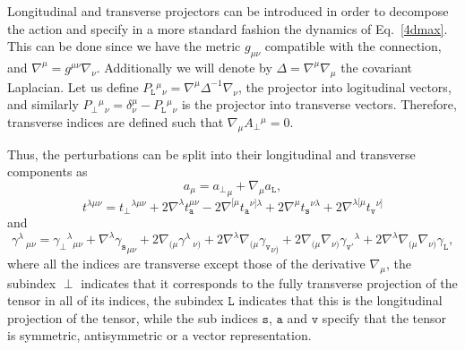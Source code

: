 \documentclass[aps,prd,12pt,twocolumn,superscriptaddress,showpacs,showkeys,reprint%
]{revtex4-1}
\newcommand\nab[1]{\nabla_{{#1}}}
\renewcommand{\(}{\left(}
\renewcommand{\)}{\right)}
\renewcommand{\[}{\left[}
\renewcommand{\]}{\right]}
\newcommand{\dn}[2]{{\mathrm{d}}^{#1}{#2}\;}
\newcommand{\hl}[1]{{\color{red} \bfseries{#1}}}
\begin{document}
Longitudinal and transverse projectors can be introduced in order to decompose the action and specify in a more standard fashion the dynamics of Eq.~\eqref{4dmax}. This can be done since we have the metric $g_{\mu\nu}$ compatible with the connection, and $\nabla^\mu=g^{\mu\nu}\nabla_\nu$. Additionally we will denote by $\Delta = \nabla^\mu\nabla_\mu$ the covariant Laplacian. Let us define $P_{\mathtt{L}}{}^\mu{}_\nu=\nabla^\mu\Delta^{-1} \nabla_\nu $, the projector into logitudinal vectors, and similarly $P_\perp{}^\mu{}_\nu=\delta^\mu_\nu -P_{\mathtt{L}}{}^\mu{}_\nu$ is the projector into transverse vectors. Therefore, transverse indices are defined such that $\nabla_\mu A_\perp{}^{\mu}=0$.

Thus, the perturbations can be split into their longitudinal and transverse components as
\begin{dmath}
  a_\mu = {a_\perp}_{\mu} + {\nabla}_{\mu}{a_{\mathtt{L}}},
\end{dmath}
\begin{dmath}
  {t}^{\lambda \mu \nu} =
  {t_\perp}^{\lambda \mu \nu}
  + 2  {\nabla}^{\lambda} {t_{\mathtt{a}}^{\mu \nu}}
  - 2  {\nabla}^{[\mu}{{t_{\mathtt{a}}}^{\nu] \lambda}} 
  + 2  {\nabla}^{\mu}{{t_{\mathtt{s}}}^{\nu \lambda}}
  + 2  {\nabla}^{\lambda [\mu}{{t_{\mathtt{v}}}^{\nu]}}
\end{dmath}
and
\begin{dmath}
  {\gamma}^{\lambda}\,_{\mu \nu}  =
  {\gamma_\perp}^{\lambda}{}_{\mu \nu}
  + {\nabla}^{\lambda}{{\gamma_{\mathtt{s}}}_{\mu \nu}}
  + 2  {\nabla}_{(\mu}{{\gamma}^{\lambda}\,_{\nu)}}
  + 2  {\nabla}^{\lambda}\nabla_{(\mu}{{\gamma_{\mathtt{v}}}_{\nu)}}
  + 2  \nab{(\mu} \nab{\nu)} {{\gamma_{\mathtt{v}'}}^{\lambda}} 
  + 2  {\nabla}^{\lambda}\nab{(\mu} \nab{\nu)}{\gamma_{\mathtt{L}}},
\end{dmath}
where all the indices are transverse except those of the derivative $\nabla_\mu$, the subindex $\perp$ indicates that it corresponds to the fully transverse projection of the tensor in all of its indices, the subindex ${\mathtt{L}}$ indicates that this is the longitudinal projection of the tensor, while the sub indices $\mathtt{s}$, $\mathtt{a}$ and $\mathtt{v}$ specify that the tensor is symmetric, antisymmetric or a vector representation.
\end{document}
